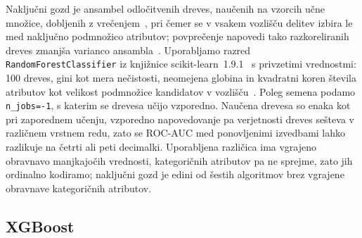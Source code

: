 \documentclass[a4paper,12pt,openright]{book}
\begin{document}
Naključni gozd je ansambel odločitvenih dreves,
naučenih na vzorcih učne množice, dobljenih z vrečenjem~\cite{breiman1996bagging},
pri čemer se v vsakem vozlišču delitev izbira le med naključno podmnožico
atributov; povprečenje napovedi tako razkoreliranih dreves zmanjša varianco
ansambla~\cite{breiman2001random}. Uporabljamo razred
\texttt{RandomForestClassifier} iz knjižnice
scikit-learn~1.9.1~\cite{pedregosa2011scikit} s privzetimi vrednostmi: 100
dreves, gini kot mera nečistosti, neomejena globina in kvadratni koren števila
atributov kot velikost podmnožice kandidatov v vozlišču~\cite{sklearndocsrf}.
Poleg semena podamo \texttt{n\_jobs=-1}, s katerim se drevesa učijo vzporedno.
Naučena drevesa so enaka kot pri zaporednem učenju, vzporedno napovedovanje pa
verjetnosti dreves sešteva v različnem vrstnem redu, zato se ROC-AUC med
ponovljenimi izvedbami lahko razlikuje na četrti ali peti decimalki. Uporabljena
različica ima vgrajeno obravnavo manjkajočih vrednosti, kategoričnih atributov
pa ne sprejme, zato jih ordinalno kodiramo; naključni gozd je edini od šestih
algoritmov brez vgrajene obravnave kategoričnih atributov.

\subsection{XGBoost}
\label{sec:xgboost}
\end{document}
